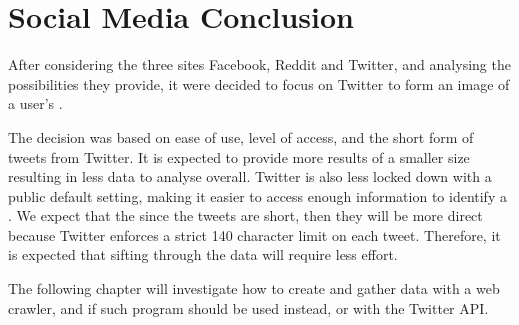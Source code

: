 \section{Social Media Conclusion}\label{sec:social-media-conclusion}
After considering the three sites Facebook, Reddit and Twitter, and
analysing the possibilities they provide, it were decided to focus on
Twitter to form an image of a user's \fb.\nl


The decision was based on ease of use, level of access, and the short form of
tweets from Twitter. It is expected to provide more results of a smaller size
resulting in less data to analyse overall. Twitter is also less locked down with
a public default setting, making it easier to access enough information to
identify a \fb. We expect that the since the tweets are short, then they will be
more direct because Twitter enforces a strict 140 character limit on each tweet.
Therefore, it is expected that sifting through the data will require less effort.\nl

The following chapter will investigate how to create and gather data with a web
crawler, and if such program should be used instead, or with the Twitter
\ac{API}.